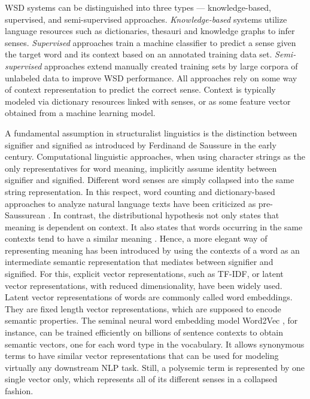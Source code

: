 \documentclass[11pt]{article}
\begin{document}
WSD systems can be distinguished into three types --- knowledge-based, supervised, and semi-supervised approaches. 
\textit{Knowledge-based} systems utilize language resources such as dictionaries, thesauri and knowledge graphs to infer senses. 
\textit{Supervised} approaches train a machine classifier to predict a sense given the target word and its context based on an annotated training data set. 
\textit{Semi-supervised} approaches extend manually created training sets by large corpora of unlabeled data to improve WSD performance. 
All approaches rely on some way of context representation to predict the correct sense.
Context is typically modeled via dictionary resources linked with senses, or as some feature vector obtained from a machine learning model.

A fundamental assumption in structuralist linguistics is the distinction between signifier and signified as introduced by Ferdinand de Saussure \cite{Saussure.2001} in the early  century. 
Computational linguistic approaches, when using character strings as the only representatives for word meaning, implicitly assume identity between signifier and signified. 
Different word senses are simply collapsed into the same string representation. 
In this respect, word counting and dictionary-based approaches to analyze natural language texts have been criticized as pre-Saussurean \cite{Pecheux.1995}.
In contrast, the distributional hypothesis not only states that meaning is dependent on context. It also states that words occurring in the same contexts tend to have a similar meaning \cite{harris:54:dh}.
Hence, a more elegant way of representing meaning has been introduced by using the contexts of a word as an intermediate semantic representation that mediates between signifier and signified.
For this, explicit vector representations, such as TF-IDF, or latent vector representations, with reduced dimensionality, have been widely used.
Latent vector representations of words are commonly called word embeddings.
They are fixed length vector representations, which are supposed to encode semantic properties. 
The seminal neural word embedding model Word2Vec \cite{mikolov.2013}, for instance, can be trained efficiently on billions of sentence contexts to obtain semantic vectors, one for each word type in the vocabulary.
It allows synonymous terms to have similar vector representations that can be used for modeling virtually any downstream NLP task. 
Still, a polysemic term is represented by one single vector only, which represents all of its different senses in a collapsed fashion.
\end{document}

